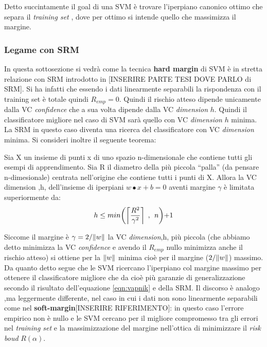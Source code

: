 Detto succintamente il goal di una \ac{SVM} è trovare l'iperpiano canonico ottimo che separa il \textit{training set} , dove per ottimo si intende quello che massimizza il margine.\\

\subsubsection{Legame con SRM}
In questa sottosezione si vedrà come la tecnica \textbf{hard margin} di \ac{SVM} è in stretta relazione con \ac{SRM} introdotto in [INSERIRE PARTE TESI DOVE  PARLO di SRM]. Si ha infatti che essendo i dati linearmente separabili la rispondenza con il training set è totale quindi $R_{emp}=0$. Quindi il rischio atteso dipende unicamente dalla \ac{VC} \textit{confidence} che a sua volta dipende dalla \ac{VC} \textit{dimension} $h$. Quindi il classificatore migliore nel caso di \ac{SVM} sarà quello con \ac{VC} \textit{dimension} $h$ minima.  La \ac{SRM} in questo caso diventa una ricerca del classificatore con \ac{VC} \textit{dimension} minima. Si consideri inoltre il seguente teorema:
\begin{teorema*}
Sia X un insieme di punti x di uno spazio n-dimensionale  che contiene tutti gli esempi di apprendimento. Sia R il diametro della più piccola ``palla'' (da pensare n-dimesionale) centrata nell'origine che contiene tutti i punti di X. Allora la \ac{VC} dimension ,h, dell'insieme di iperpiani $w \bullet x + b = 0$ aventi margine $\gamma$ è limitata superiormente da: 
\begin{equation*}
h \leq min \biggl( \ceil*{\frac{R^{2}}{\gamma^{2}}} \:\:,\:\: n \biggl) + 1
\end{equation*}
\end{teorema*}
Siccome il margine è $\gamma = 2/\lVert w\rVert$ la \ac{VC} \textit{dimension},h, più piccola (che abbiamo detto minimizza la \ac{VC} \textit{confidence} e avendo il $R_{emp}$ nullo minimizza anche il rischio atteso) si ottiene per la $\lVert w\rVert$ minima cioè per il margine ($2/\lVert w\rVert$) massimo.  Da quanto detto segue che le \ac{SVM} ricercano l'iperpiano col margine massimo per ottenere il classificatore migliore che da cioè più garanzie di generalizzazione secondo il risultato dell'equazione \eqref{eqn:vapnik} e della \ac{SRM}.
Il discorso è analogo ,ma leggermente differente, nel caso in cui i dati non sono linearmente separabili come nel \textbf{soft-margin}[INSERIRE RIFERIMENTO]: in questo caso l'errore empirico non è nullo e le \ac{SVM} cercano per il migliore compromesso tra gli errori nel \textit{training set} e la massimizzazione del margine nell'ottica di minimizzare il \textit{risk boud} $R(\alpha)$.